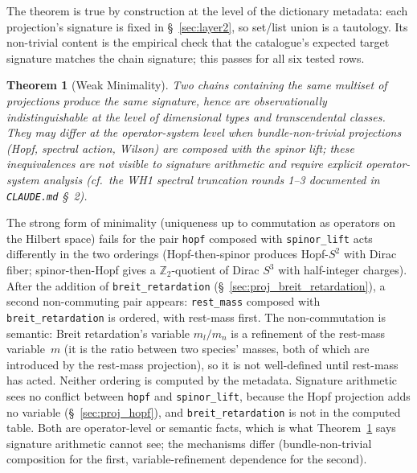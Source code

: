 \documentclass[11pt]{article}
\newtheorem{theorem}{Theorem}
\begin{document}
The theorem is true by construction at the level of the dictionary
metadata: each projection's signature is fixed in
\S~\ref{sec:layer2}, so set/list union is a tautology.  Its
non-trivial content is the empirical check that the catalogue's
expected target signature matches the chain signature; this passes
for all six tested rows.

\begin{theorem}[Weak Minimality]
\label{thm:minimality}
Two chains containing the same multiset of projections produce the
same signature, hence are observationally indistinguishable at the
level of dimensional types and transcendental classes.  They may
differ at the operator-system level when bundle-non-trivial
projections (Hopf, spectral action, Wilson) are composed with the
spinor lift; these inequivalences are not visible to signature
arithmetic and require explicit operator-system analysis (cf.\ the
WH1 spectral truncation rounds 1--3 documented in
\texttt{CLAUDE.md} \S~2).
\end{theorem}

The strong form of minimality (uniqueness up to commutation as
operators on the Hilbert space) fails for the pair
\texttt{hopf} composed with \texttt{spinor\_lift} acts differently in
the two orderings (Hopf-then-spinor produces Hopf-$S^2$ with Dirac
fiber; spinor-then-Hopf gives a $\mathbb{Z}_2$-quotient of Dirac
$S^3$ with half-integer charges).  After the addition of
\texttt{breit\_retardation} (\S~\ref{sec:proj_breit_retardation}),
a second non-commuting pair appears:
\texttt{rest\_mass} composed with \texttt{breit\_retardation} is
ordered, with rest-mass first.  The non-commutation is semantic:
Breit retardation's variable $m_l/m_n$ is a refinement of the
rest-mass variable~$m$ (it is the ratio between two species' masses,
both of which are introduced by the rest-mass projection), so it is
not well-defined until rest-mass has acted.  Neither ordering is
computed by the metadata.  Signature arithmetic sees no conflict
between \texttt{hopf} and \texttt{spinor\_lift}, because the Hopf
projection adds no variable (\S~\ref{sec:proj_hopf}), and
\texttt{breit\_retardation} is not in the computed table.  Both are
operator-level or semantic facts, which is what
Theorem~\ref{thm:minimality} says signature arithmetic cannot see; the
mechanisms differ (bundle-non-trivial composition for the first,
variable-refinement dependence for the second).
\end{document}
